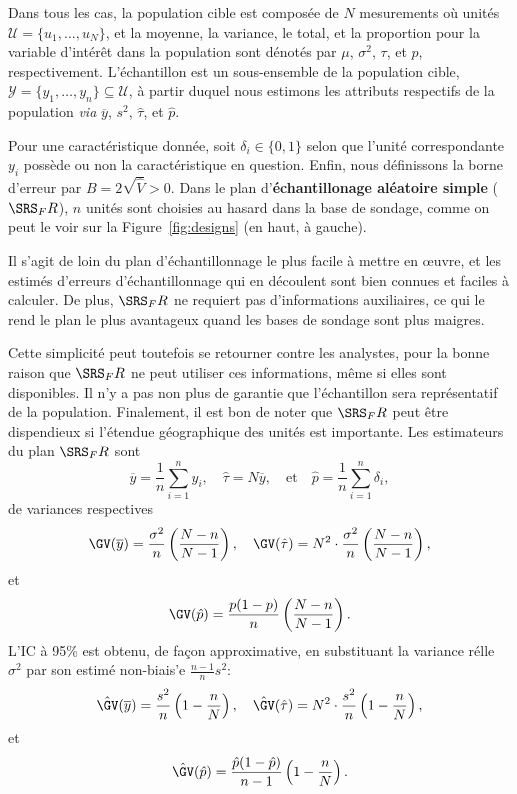 \newl 
Dans tous les cas, la population cible est compos\'ee de $N$ mesurements o\`u unités $\mathcal{U}=\{u_1,\ldots,u_N\}$, et la moyenne, la variance, le total, et la proportion pour la variable d'intérêt dans la population sont d\'enot\'es par $\mu$, $\sigma^2$, $\tau$, et $p$, respectivement. L'échantillon est un sous-ensemble de la population cible, $\mathcal{Y}=\{y_1,\ldots,y_n\}\subseteq \mathcal{U}$, à partir duquel nous estimons les attributs respectifs de la population \textit{via} $\overline{y}$, $s^2$, $\hat{\tau}$, et $\hat{p}$. \par Pour une caractéristique donnée, soit $\delta_i\in\{0,1\}$ selon que l'unité correspondante $y_i$ possède ou non la caractéristique en question. Enfin, nous définissons la borne d'erreur par $B=2\sqrt{\hat{V}}>0$.\newpage\noindent 
Dans le plan d'\textbf{\'echantillonage aléatoire simple} ($\SRS_FR$), $n$ unit\'es sont choisies au hasard dans la base de sondage, comme on peut le voir sur la Figure~\ref{fig:designs} (en haut, à gauche). \par Il s'agit de loin du plan d'échantillonnage le plus facile à mettre en œuvre, et les estim\'es d'erreurs d'échantillonnage qui en découlent sont bien connues et faciles à calculer. De plus, $\SRS_FR$ ne requiert pas d'informations auxiliaires, ce qui le rend le plan le plus avantageux quand les bases de sondage sont plus maigres. \par Cette simplicit\'e peut toutefois se retourner contre les analystes, pour la bonne raison que $\SRS_FR$ ne peut utiliser ces informations, même si elles sont disponibles. Il n'y a pas non plus de garantie que l'échantillon sera représentatif de la population. Finalement, il est bon de noter que $\SRS_FR$ peut être dispendieux si l'étendue géographique des unit\'es est importante.\newl 
Les estimateurs du plan $\SRS_FR$ sont 
$$\overline{y}=\frac{1}{n}\sum_{i=1}^n y_i, \quad \hat{\tau}=N\overline{y}, \quad\mbox{et}\quad \hat{p}=\frac{1}{n}\sum_{i=1}^n \delta_i,$$ de variances respectives
$$\GV(\overline{y})=\frac{\sigma^2}{n}\left(\frac{N-n}{N-1}\right),\quad \GV(\hat{\tau})=N^2\cdot\frac{\sigma^2}{n}\left(\frac{N-n}{N-1}\right),$$ et $$\GV(\hat{p})=\frac{p(1-p)}{n}\left(\frac{N-n}{N-1}\right).$$
L'IC \`a 95\% est obtenu, de fa\c{c}on approximative, en substituant la variance r\'elle $\sigma^2$ par son estim\'e non-biais'e $\frac{n-1}{n}s^2$: $$\hat{\GV}(\overline{y})=\frac{s^2}{n}\left(1-\frac{n}{N}\right), \quad
\hat{\GV}(\hat{\tau})=N^2\cdot\frac{s^2}{n}\left(1-\frac{n}{N}\right),$$ et $$\hat{\GV}(\hat{p})=\frac{\hat{p}(1-\hat{p})}{n-1}\left(1-\frac{n}{N}\right).$$
